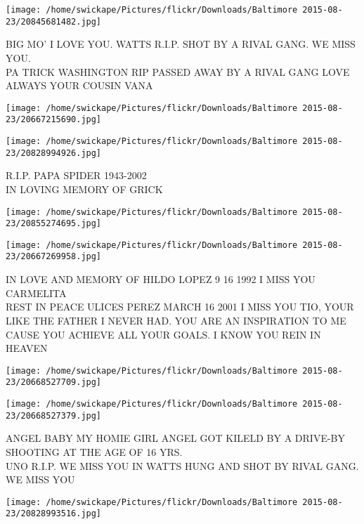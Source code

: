 \documentclass[10pt,letterpaper]{article}
\begin{document}
\vspace{0.25in}
\texttt{[image: /home/swickape/Pictures/flickr/Downloads/Baltimore 2015-08-23/20845681482.jpg]}

BIG MO' I LOVE YOU. WATTS R.I.P. SHOT BY A RIVAL GANG.  WE MISS YOU.\\
PA TRICK WASHINGTON RIP PASSED AWAY BY A RIVAL GANG LOVE ALWAYS YOUR COUSIN VANA\\
\pagebreak

\texttt{[image: /home/swickape/Pictures/flickr/Downloads/Baltimore 2015-08-23/20667215690.jpg]}

\vspace{0.25in}
\texttt{[image: /home/swickape/Pictures/flickr/Downloads/Baltimore 2015-08-23/20828994926.jpg]}

R.I.P. PAPA SPIDER 1943{-}2002\\
IN LOVING MEMORY OF GRICK\\
\pagebreak

\texttt{[image: /home/swickape/Pictures/flickr/Downloads/Baltimore 2015-08-23/20855274695.jpg]}

\vspace{0.25in}
\texttt{[image: /home/swickape/Pictures/flickr/Downloads/Baltimore 2015-08-23/20667269958.jpg]}

IN LOVE AND MEMORY OF HILDO LOPEZ 9 16 1992 I MISS YOU CARMELITA\\
REST IN PEACE ULICES PEREZ MARCH 16 2001 I MISS YOU TIO, YOUR LIKE THE FATHER I NEVER HAD.  YOU ARE AN INSPIRATION TO ME CAUSE YOU ACHIEVE ALL YOUR GOALS.  I KNOW YOU REIN IN HEAVEN\\
\pagebreak

\texttt{[image: /home/swickape/Pictures/flickr/Downloads/Baltimore 2015-08-23/20668527709.jpg]}

\vspace{0.25in}
\texttt{[image: /home/swickape/Pictures/flickr/Downloads/Baltimore 2015-08-23/20668527379.jpg]}

ANGEL BABY MY HOMIE GIRL ANGEL GOT KILELD BY A DRIVE{-}BY SHOOTING AT THE AGE OF 16 YRS.\\
UNO R.I.P.  WE MISS YOU IN WATTS HUNG AND SHOT BY RIVAL GANG.  WE MISS YOU\\
\pagebreak

\texttt{[image: /home/swickape/Pictures/flickr/Downloads/Baltimore 2015-08-23/20828993516.jpg]}
\end{document}
